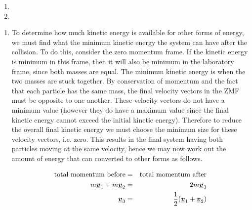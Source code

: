 
\begin{problem} %
 {
 \begin{enumerate}
\item  {}  
 \item {}   
\end{enumerate} 
}
{}
{
\begin{enumerate}
\item To determine how much kinetic energy is available for other forms of energy, we must find what the minimum kinetic energy the system can have after the collision. To do this, consider the zero momentum frame. If the kinetic energy is minimum in this frame, then it will also be minimum in the laboratory frame, since both masses are equal. The minimum kinetic energy is when the two masses are stuck together. By conservation of momentum and the fact that each particle has the same mass, the final velocity vectors in the ZMF must be opposite to one another. These velocity vectors do not have a minimum value (however they do have a maximum value since the final kinetic energy cannot exceed the initial kinetic energy). Therefore to reduce the overall final kinetic energy we must choose the minimum size for these velocity vectors, i.e. zero. This results in the final system having both particles moving at the same velocity, hence we may now work out the amount of energy that can converted to other forms as follows.

\begin{eqnarray*}
\text{total~momentum~before} &=& \text{total~momentum~after} \\
m\mathit{\underline{\boldsymbol{v}}}_{1}+m\mathit{\underline{\boldsymbol{v}}}_{2} &=& 2m\mathit{\underline{\boldsymbol{v}}}_{3} \\
\mathit{\underline{\boldsymbol{v}}}_{3} &=& \frac{1}{2}(\mathit{\underline{\boldsymbol{v}}}_{1}+\mathit{\underline{\boldsymbol{v}}}_{2})
\end{eqnarray*}


\end{enumerate}}
\end{problem}
